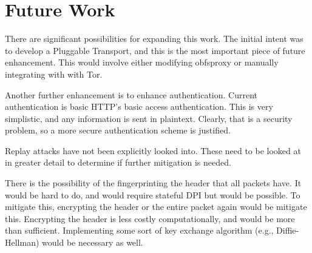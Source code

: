 \section{Future Work}

There are significant possibilities for expanding this work. The initial intent was to develop a Pluggable Transport, and this is the most important piece of future enhancement. This would involve either modifying obfsproxy or manually integrating with with Tor.

Another further enhancement is to enhance authentication. Current authentication is basic HTTP's basic access authentication. This is very simplistic, and any information is sent in plaintext. Clearly, that is a security problem, so a more secure authentication scheme is justified.

Replay attacks have not been explicitly looked into. These need to be looked at in greater detail to determine if further mitigation is needed.

There is the possibility of the fingerprinting the header that all packets have. It would be hard to do, and would require stateful DPI but would be possible. To mitigate this, encrypting the header or the entire packet again would be mitigate this. Encrypting the header is less costly computationally, and would be more than sufficient. Implementing some sort of key exchange algorithm (e.g., Diffie-Hellman) would be necessary as well.
